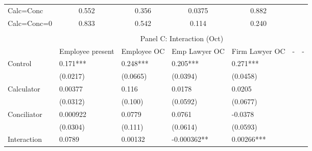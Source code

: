 \begin{tabular}{rrrrrrr}
\multicolumn{1}{l}{Calc=Conc} & \multicolumn{1}{c}{0.552} & \multicolumn{1}{c}{0.356} & \multicolumn{1}{c}{0.0375} & \multicolumn{1}{c}{0.882} & \multicolumn{1}{c}{} & \multicolumn{1}{c}{} \\
\multicolumn{1}{l}{Calc=Conc=0} & \multicolumn{1}{c}{0.833} & \multicolumn{1}{c}{0.542} & \multicolumn{1}{c}{0.114} & \multicolumn{1}{c}{0.240} & \multicolumn{1}{c}{} & \multicolumn{1}{c}{} \\
\bottomrule
\multicolumn{1}{l}{} &       &       &       &       &       &  \\
\toprule
\multicolumn{1}{l}{} & \multicolumn{6}{c}{Panel C: Interaction (Oct)} \\
\midrule
\multicolumn{1}{l}{} & \multicolumn{1}{c}{Employee present} & \multicolumn{1}{c}{Employee OC} & \multicolumn{1}{c}{Emp Lawyer OC} & \multicolumn{1}{c}{Firm Lawyer OC} & \multicolumn{1}{c}{-} & \multicolumn{1}{c}{-} \\
\midrule
\multicolumn{1}{l}{Control} & \multicolumn{1}{l}{0.171***} & \multicolumn{1}{l}{0.248***} & \multicolumn{1}{l}{0.205***} & \multicolumn{1}{l}{0.271***} & \multicolumn{1}{l}{} & \multicolumn{1}{l}{} \\
\multicolumn{1}{l}{} & \multicolumn{1}{l}{(0.0217)} & \multicolumn{1}{l}{(0.0665)} & \multicolumn{1}{l}{(0.0394)} & \multicolumn{1}{l}{(0.0458)} & \multicolumn{1}{l}{} & \multicolumn{1}{l}{} \\
\multicolumn{1}{l}{Calculator} & \multicolumn{1}{l}{0.00377} & \multicolumn{1}{l}{0.116} & \multicolumn{1}{l}{0.0178} & \multicolumn{1}{l}{0.0205} & \multicolumn{1}{l}{} & \multicolumn{1}{l}{} \\
\multicolumn{1}{l}{} & \multicolumn{1}{l}{(0.0312)} & \multicolumn{1}{l}{(0.100)} & \multicolumn{1}{l}{(0.0592)} & \multicolumn{1}{l}{(0.0677)} & \multicolumn{1}{l}{} & \multicolumn{1}{l}{} \\
\multicolumn{1}{l}{Conciliator} & \multicolumn{1}{l}{0.000922} & \multicolumn{1}{l}{0.0779} & \multicolumn{1}{l}{0.0761} & \multicolumn{1}{l}{-0.0378} & \multicolumn{1}{l}{} & \multicolumn{1}{l}{} \\
\multicolumn{1}{l}{} & \multicolumn{1}{l}{(0.0304)} & \multicolumn{1}{l}{(0.111)} & \multicolumn{1}{l}{(0.0614)} & \multicolumn{1}{l}{(0.0593)} & \multicolumn{1}{l}{} & \multicolumn{1}{l}{} \\
\multicolumn{1}{l}{Interaction} & \multicolumn{1}{l}{0.0789} & \multicolumn{1}{l}{0.00132} & \multicolumn{1}{l}{-0.000362**} & \multicolumn{1}{l}{0.00266***} & \multicolumn{1}{l}{} & \multicolumn{1}{l}{} \\

\end{tabular}
